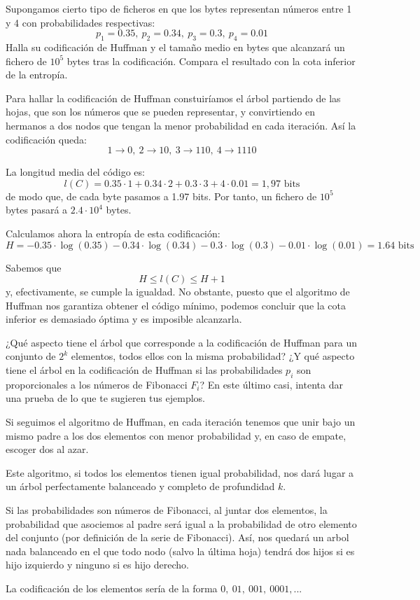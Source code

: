 \begin{problem}[10]
Supongamos cierto tipo de ficheros en que los bytes representan números entre 1 y 4 con probabilidades respectivas:
\[p_1 = 0.35, \ p_2=0.34, \ p_3 = 0.3, \ p_4=0.01\]
Halla su codificación de Huffman y el tamaño medio en bytes que alcanzará un fichero de $10^5$ bytes tras la codificación. Compara el resultado con la cota inferior de la entropía.
\solution

\yoP

Para hallar la codificación de Huffman constuiríamos el árbol partiendo de las hojas, que son los números que se pueden representar, y convirtiendo en hermanos a dos nodos que tengan la menor probabilidad en cada iteración. Así la codificación queda:
\[1 \to 0, \ 2 \to 10, \ 3 \to 110, \ 4 \to 1110\]

La longitud media del código es:
\[l(C)=0.35\cdot 1+0.34\cdot 2+0.3\cdot 3+4\cdot 0.01 = 1,97 \text{ bits}\]
de modo que, de cada byte pasamos a 1.97 bits. Por tanto, un fichero de $10^5$ bytes pasará a $2.4\cdot 10^4$ bytes.

Calculamos ahora la entropía de esta codificación:
\[H=-0.35\cdot \log (0.35)-0.34\cdot \log (0.34)-0.3\cdot \log (0.3)-0.01\cdot \log (0.01) = 1.64 \text{ bits}\]

Sabemos que
\[H \leq l(C) \leq H+1\]
y, efectivamente, se cumple la igualdad. No obstante, puesto que el algoritmo de Huffman nos garantiza obtener el código mínimo, podemos concluir que la cota inferior es demasiado óptima y es imposible alcanzarla.
\end{problem}

\begin{problem}[11]
¿Qué aspecto tiene el árbol que corresponde a la codificación de Huffman para un conjunto de $2^k$ elementos, todos ellos con la misma probabilidad? ¿Y qué aspecto tiene el árbol en la codificación de Huffman si las probabilidades $p_i$ son proporcionales a los números de Fibonacci $F_i$? En este último casi, intenta dar una prueba de lo que te sugieren tus ejemplos.
\solution

\yoP

Si seguimos el algoritmo de Huffman, en cada iteración tenemos que unir bajo un mismo padre a los dos elementos con menor probabilidad y, en caso de empate, escoger dos al azar.

Este algoritmo, si todos los elementos tienen igual probabilidad, nos dará lugar a un árbol perfectamente balanceado y completo de profundidad $k$.

Si las probabilidades son números de Fibonacci, al juntar dos elementos, la probabilidad que asociemos al padre será igual a la probabilidad de otro elemento del conjunto (por definición de la serie de Fibonacci). Así, nos quedará un arbol nada balanceado en el que todo nodo (salvo la última hoja) tendrá dos hijos si es hijo izquierdo y ninguno si es hijo derecho.

La codificación de los elementos sería de la forma $0, \ 01, \ 001, \ 0001, ...$
\end{problem}

